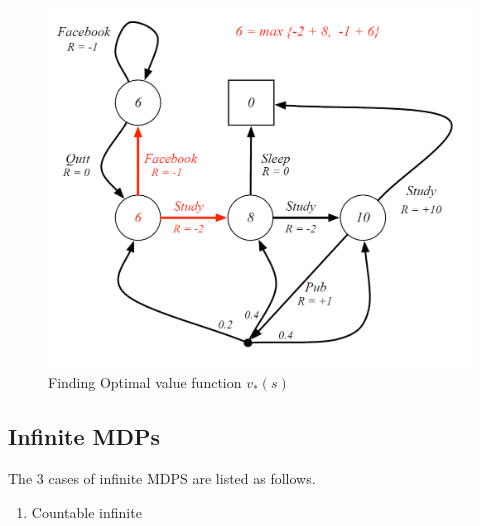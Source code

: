 \documentclass{article}
\begin{document}
	\begin{figure}[h]
		\centering
		\includegraphics[scale=0.5]{ch2fig7.png}
		\caption{Finding Optimal value function $v_*(s)$}
	\end{figure}
	
	\subsection{Infinite MDPs}
	
	The 3 cases of infinite MDPS are listed as follows.
	\begin{enumerate}
		\item Countable infinite
	\end{enumerate}
	
	
	
		
	
\end{document}
